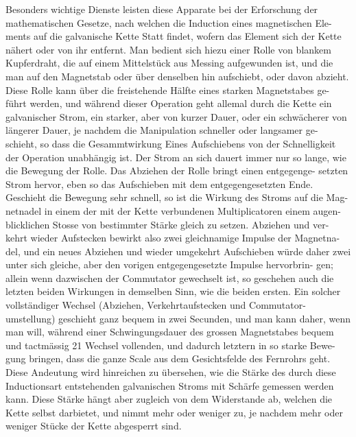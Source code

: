 \documentclass[12pt,a4paper]{article}
\begin{document}
Besonders wichtige Dienste leisten diese Apparate bei der Erforschung der 
mathematischen Gesetze, nach welchen die Induction eines magnetischen Ele-
ments auf die galvanische Kette Statt findet, wofern das Element sich der Kette 
nähert oder von ihr entfernt. Man bedient sich hiezu einer Rolle von blankem 
Kupferdraht, die auf einem Mittelstück aus Messing aufgewunden ist, und die 
man auf den Magnetstab oder über denselben hin aufschiebt, oder davon abzieht. 
Diese Rolle kann über die freistehende Hälfte eines starken Magnetstabes ge-
führt werden, und während dieser Operation geht allemal durch die Kette ein 
galvanischer Strom, ein starker, aber von kurzer Dauer, oder ein schwächerer 
von längerer Dauer, je nachdem die Manipulation schneller oder langsamer ge-
schieht, so dass die Gesammtwirkung Eines Aufschiebens von der Schnelligkeit 
der Operation unabhängig ist. Der Strom an sich dauert immer nur so lange, 
wie die Bewegung der Rolle. Das Abziehen der Rolle bringt einen entgegenge-
setzten Strom hervor, eben so das Aufschieben mit dem entgegengesetzten Ende. 
Geschieht die Bewegung sehr schnell, so ist die Wirkung des Stroms auf die Mag-
netnadel in einem der mit der Kette verbundenen Multiplicatoren einem augen-
blicklichen Stosse von bestimmter Stärke gleich zu setzen. Abziehen und ver-
kehrt wieder Aufstecken bewirkt also zwei gleichnamige Impulse der Magnetna-
del, und ein neues Abziehen und wieder umgekehrt Aufschieben würde daher 
zwei unter sich gleiche, aber den vorigen entgegengesetzte Impulse hervorbrin-
gen; allein wenn dazwischen der Commutator gewechselt ist, so geschehen auch 
die letzten beiden Wirkungen in demselben Sinn, wie die beiden ersten. Ein 
solcher vollständiger Wechsel (Abziehen, Verkehrtaufstecken und Commutator-
umstellung) geschieht ganz bequem in zwei Secunden, und man kann daher, wenn 
man will, während einer Schwingungsdauer des grossen Magnetstabes bequem 
und tactmässig 21 Wechsel vollenden, und dadurch letztern in so starke Bewe-
gung bringen, dass die ganze Scale aus dem Gesichtsfelde des Fernrohrs geht. 
Diese Andeutung wird hinreichen zu übersehen, wie die Stärke des durch diese 
Inductionsart entstehenden galvanischen Stroms mit Schärfe gemessen werden 
kann. Diese Stärke hängt aber zugleich von dem Widerstande ab, welchen die 
Kette selbst darbietet, und nimmt mehr oder weniger zu, je nachdem mehr oder 
weniger Stücke der Kette abgesperrt sind.
\end{document}
